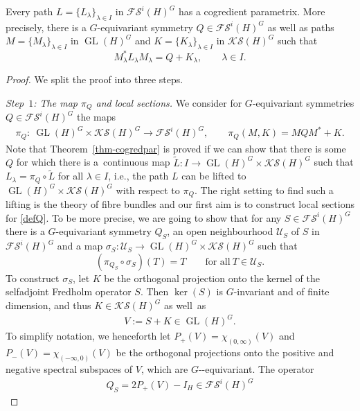 \documentclass[10pt,a4paper]{amsart}
\providecommand{\nobreakdash}{\nobreak\hbox{-}}
\DeclareMathOperator{\GL}{GL}
\begin{document}
\begin{Theorem}\label{thm-cogredpar}
Every path $L=\{L_\lambda\}_{\lambda\in I}$ in $\mathcal{FS}^i(H)^G$ has a cogredient parametrix. More precisely, there is a $G$-equivariant symmetry $Q\in\mathcal{FS}^i(H)^G$ as well as paths $M=\{M_\lambda\}_{\lambda\in I}$ in $\GL(H)^G$ and $K=\{K_\lambda\}_{\lambda\in I}$ in $\mathcal{KS}(H)^G$ such that
\[M^\ast_\lambda L_\lambda M_\lambda=Q+K_\lambda,\qquad\lambda\in I.\]
\end{Theorem}

\begin{proof}
We split the proof into three steps.

{\it Step~$1$: The map $\pi_Q$ and local sections.}
We consider for $G$-equivariant symmetries $Q\in\mathcal{FS}^i(H)^G$ the maps
\begin{align}\label{defQ}
\pi_Q \colon \ \GL(H)^G\times\mathcal{KS}(H)^G\rightarrow\mathcal{FS}^i(H)^G,\qquad \pi_Q(M,K)=MQM^\ast+K.
\end{align}
Note that Theorem~\ref{thm-cogredpar} is proved if we can show that there is some $Q$ for which there is a~continuous map $\tilde{L} \colon I\rightarrow \GL(H)^G\times\mathcal{KS}(H)^G$ such that $L_\lambda=\pi_Q\circ\tilde{L}$ for all $\lambda\in I$, i.e., the path $L$ can be lifted to $\GL(H)^G\times\mathcal{KS}(H)^G$ with respect to $\pi_Q$. The right setting to find such a lifting is the theory of fibre bundles and our first aim is to construct local sections for \eqref{defQ}. To be more precise, we are going to show that for any $S\in\mathcal{FS}^i(H)^G$ there is a $G$-equivariant symmetry $Q_S$, an open neighbourhood $\mathcal{U}_S$ of $S$ in $\mathcal{FS}^i(H)^G$ and a map $\sigma_S \colon \mathcal{U}_S\rightarrow\GL(H)^G\times\mathcal{KS}(H)^G$ such that
\[(\pi_{Q_S}\circ\sigma_S)(T)=T\qquad\text{for all} \ T\in\mathcal{U}_S.\]
To construct $\sigma_S$, let $K$ be the orthogonal projection onto the kernel of the selfadjoint Fredholm operator $S$. Then $\ker(S)$ is $G$-invariant and of finite dimension, and thus $K\in\mathcal{KS}(H)^G$ as well~as
\begin{align}\label{V}
V:=S+K\in \GL(H)^G.
\end{align}
To simplify notation, we henceforth let $P_+(V)=\chi_{(0,\infty)}(V)$ and $P_-(V)=\chi_{(-\infty,0)}(V)$ be the orthogonal projections onto the positive and negative spectral subspaces of $V$, which are $G$\nobreakdash-equiv\-ari\-ant. The operator
\begin{align}\label{QS}
Q_S=2P_+(V)-I_H\in\mathcal{FS}^i(H)^G
\end{align}

\end{proof}
\end{document}
